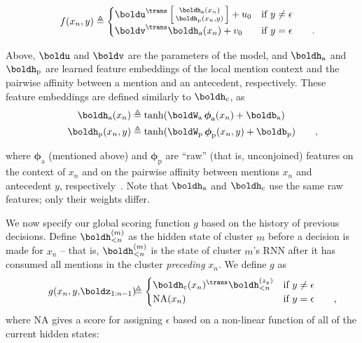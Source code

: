 \documentclass[11pt,letterpaper]{article}
\newcommand{\ua}{\ensuremath{\mathrm{a}}}
\newcommand{\up}{\ensuremath{\mathrm{p}}}
\newcommand{\ha}{\boldh_{\ua}}
\newcommand{\hp}{\boldh_{\up}}
\newcommand{\aphi}{\boldsymbol{\phi}_{\mathrm{a}}}
\newcommand{\pwphi}{\boldsymbol{\phi}_{\mathrm{p}}}
\newcommand{\ab}{\boldb_{\mathrm{\ua}}}
\newcommand{\pb}{\boldb_{\mathrm{\up}}}
\newcommand{\aW}{\boldW_{\mathrm{\ua}}}
\newcommand{\pW}{\boldW_{\mathrm{\up}}}
\newcommand{\uc}{\ensuremath{\mathrm{c}}}
\newcommand{\hc}{\boldh_{\uc}}
\newcommand{\eqpunc}[1]{{\makebox[0pt][l]{\qquad\rm{#1}}}}
\begin{document}
\vspace{-1mm}
{\small 
\begin{align*}
f(x_n,y) &\triangleq  \begin{cases} \boldu^\trans \left[ \begin{smallmatrix} \ha(x_n) \\ \hp(x_n,y) \end{smallmatrix}\right] + u_0 &\mbox{if } y \neq \epsilon \\
\boldv^\trans \ha(x_n) + v_0 &\mbox{if } y = \epsilon\eqpunc{.}  \end{cases}
\end{align*}
}

\vspace{-2mm}
\noindent Above, $\boldu$ and $\boldv$ are the parameters of the model, and $\ha$ and $\hp$ are learned feature embeddings of the local mention context and the pairwise affinity between a mention and an antecedent, respectively. These feature embeddings are defined similarly to $\hc$, as
\vspace{-1mm}
{\small
\begin{align*}
\ha(x_n) &\triangleq \tanh(\aW \, \aphi(x_n) + \ab) \\
\hp(x_n,y) &\triangleq \tanh(\pW \, \pwphi(x_n,y) + \pb)\eqpunc{,}
\end{align*}
}

\vspace{-5mm}
\noindent where $\aphi$ (mentioned above) and $\pwphi$ are ``raw'' (that is, unconjoined) features on the context of $x_n$ and on the pairwise affinity between mentions $x_n$ and antecedent $y$, respectively~\cite{wiseman15learning}. Note that $\ha$ and $\hc$ use the same raw features; only their weights differ.

We now specify our global scoring function $g$ based on the history of 
previous decisions. Define $\boldh_{<n}^{(m)}$ as the hidden state 
of cluster $m$ before a decision is made for $x_n$ -- that is, $\boldh_{<n}^{(m)}$ is the state of cluster $m$'s RNN after it has consumed all mentions in the cluster \textit{preceding} $x_n$.
We define $g$ as 
{\small\begin{align*}
g(x_n, y, &\boldz_{1:n-1}) \hspace{-4mm} &\triangleq \begin{cases} \hc(x_n)^\trans \boldh^{(z_{y})}_{<n} &\mbox{if } y \neq \epsilon \\
 \mathrm{NA}(x_n) &\mbox{if } y = \epsilon\eqpunc{,}  \end{cases}
\end{align*}}where $\mathrm{NA}$ gives a score for assigning $\epsilon$ based on 
a non-linear function of all of the current hidden states:
\end{document}
